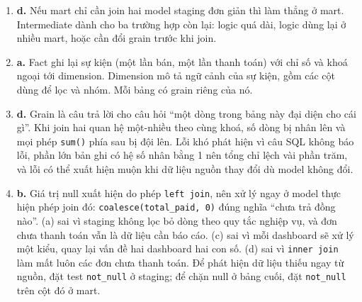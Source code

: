 \documentclass[11pt,a4paper]{article}
\newcommand{\code}[1]{\texttt{#1}}
\begin{document}
\begin{enumerate}[label=\textbf{Câu \arabic*.},leftmargin=*,itemsep=6pt]
  \item \textbf{d.} Nếu mart chỉ cần join hai model staging đơn giản thì làm thẳng ở
  mart. Intermediate dành cho ba trường hợp còn lại: logic quá dài, logic dùng lại ở
  nhiều mart, hoặc cần đổi grain trước khi join.

  \item \textbf{a.} Fact ghi lại sự kiện (một lần bán, một lần thanh toán) với chỉ số và
  khoá ngoại tới dimension. Dimension mô tả ngữ cảnh của sự kiện, gồm các cột dùng để
  lọc và nhóm. Mỗi bảng có grain riêng của nó.

  \item \textbf{d.} Grain là câu trả lời cho câu hỏi ``một dòng trong bảng này đại diện
  cho cái gì''. Khi join hai quan hệ một-nhiều theo cùng khoá, số dòng bị nhân lên và
  mọi phép \code{sum()} phía sau bị đội lên. Lỗi khó phát hiện vì câu SQL không báo lỗi,
  phần lớn bản ghi có hệ số nhân bằng 1 nên tổng chỉ lệch vài phần trăm, và lỗi có thể
  xuất hiện muộn khi dữ liệu nguồn thay đổi dù model không đổi.

  \item \textbf{b.} Giá trị null xuất hiện do phép \code{left join}, nên xử lý ngay ở model
  thực hiện phép join đó: \code{coalesce(total\_paid, 0)} đúng nghĩa ``chưa trả đồng
  nào''. (a) sai vì staging không lọc bỏ dòng theo quy tắc nghiệp vụ, và đơn chưa thanh
  toán vẫn là dữ liệu cần báo cáo. (c) sai vì mỗi dashboard sẽ xử lý một kiểu, quay lại
  vấn đề hai dashboard hai con số. (d) sai vì \code{inner join} làm mất luôn các đơn chưa
  thanh toán. Để phát hiện dữ liệu thiếu ngay từ nguồn, đặt test \code{not\_null} ở
  staging; để chặn null ở bảng cuối, đặt \code{not\_null} trên cột đó ở mart.

\end{enumerate}
\end{document}
